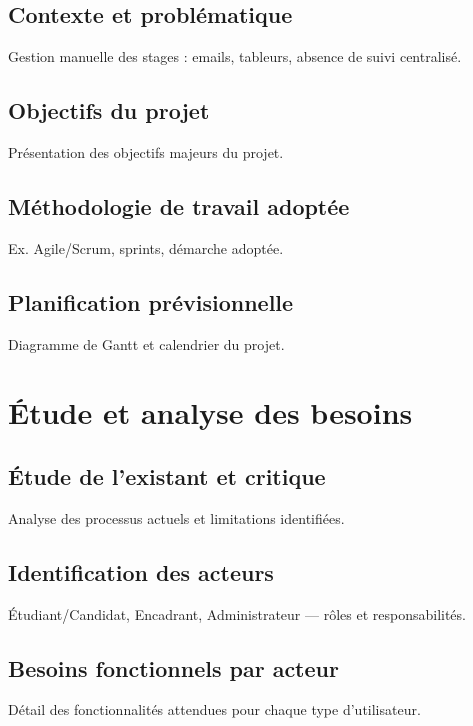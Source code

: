 \documentclass[14pt,a4paper]{article}
\begin{document}
\subsection{Contexte et problématique}
\hspace{.8cm} Gestion manuelle des stages : emails, tableurs, absence de suivi centralisé.

\subsection{Objectifs du projet}
\hspace{.8cm} Présentation des objectifs majeurs du projet.

\subsection{Méthodologie de travail adoptée}
\hspace{.8cm} Ex. Agile/Scrum, sprints, démarche adoptée.

\subsection{Planification prévisionnelle}
\hspace{.8cm} Diagramme de Gantt et calendrier du projet.

\newpage
\section{Étude et analyse des besoins}

\subsection{Étude de l'existant et critique}
\hspace{.8cm} Analyse des processus actuels et limitations identifiées.

\subsection{Identification des acteurs}
\hspace{.8cm} Étudiant/Candidat, Encadrant, Administrateur — rôles et responsabilités.

\subsection{Besoins fonctionnels par acteur}
\hspace{.8cm} Détail des fonctionnalités attendues pour chaque type d'utilisateur.
\end{document}
